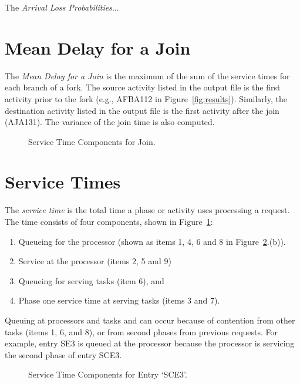 The \emph{Arrival Loss Probabilities}...

\section{Mean Delay for a Join}
\label{sec:join-delay-out}

The \emph{Mean Delay for a Join} is the maximum of the sum
of the service times for each branch of a fork.  The source activity
listed in the output file is the first activity prior to the fork
(e.g., AFBA112 in Figure~\ref{fig:results}).  Similarly, the
destination activity listed in the output file is the first activity
after the join (AJA131).  The variance of the join
time is also computed.


\begin{figure}[htbp]
  \centering
  \caption{Service Time Components for Join.}
  \label{fig:service-time}
\end{figure}

\section{Service Times}
\label{sec:service-time-out}

The \emph{service time} is the total time a phase or activity uses processing a
request.  The time consists of four components, shown in
Figure~\ref{fig:service-time}:
\begin{enumerate}
\item Queueing for the processor (shown as
  items 1, 4, 6 and 8 in Figure~\ref{fig:results-service-time}.(b)).
\item Service at the processor (items 2, 5 and 9)
\item Queueing for serving tasks (item 6), and
\item Phase one service time at serving
  tasks (items 3 and 7).
\end{enumerate}
Queuing at processors and tasks and can occur because of contention
from other tasks (items 1, 6, and 8), or from second phases from
previous requests.  For example, entry SE3 is queued at the processor
because the processor is servicing the second phase of entry SCE3.

\begin{figure}[htbp]
  \centering
  \caption{Service Time Components for Entry `SCE3'.}
  \label{fig:results-service-time}
\end{figure}

